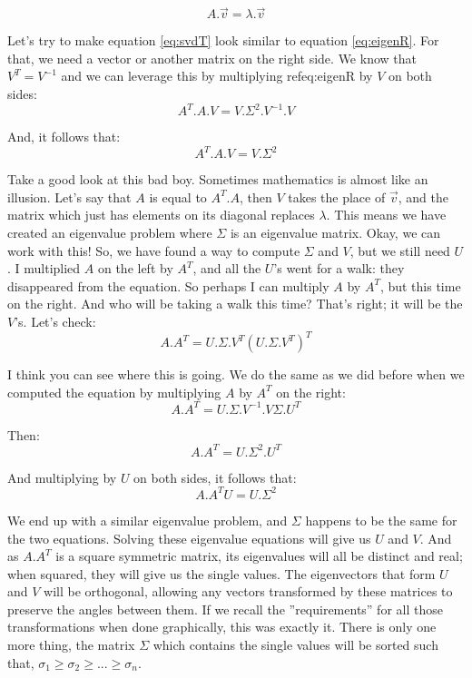 \documentclass[a4,12pt,twosided,openany]{memoir}
\begin{document}
\begin{equation}\label{eq:eigenR}
A.\overrightarrow{v} = \lambda.\overrightarrow{v}
\end{equation}
\par 
\indent
Let’s try to make equation \ref{eq:svdT} look similar to equation \ref{eq:eigenR}. For that, we need a vector or another matrix on the right side. We know that $V^T=V^{−1}$ and we can leverage this by multiplying ref{eq:eigenR} by $V$ on both sides:
\[A^T.A.V = V.\Sigma^2.V^{-1}.V\]
\par 
\indent
And, it follows that:
\begin{equation}\label{eq:finalV}
A^T.A.V = V.\Sigma^2
\end{equation}
\par 
\indent
Take a good look at this bad boy. Sometimes mathematics is almost like an illusion. Let’s say that $A$ is equal to $A^T.A$, then $V$ takes the place of $\overrightarrow{v}$, and the matrix which just has elements on its diagonal replaces $\lambda$. This means we have created an eigenvalue problem where $\Sigma$ is an eigenvalue matrix. Okay, we can work with this! So, we have found a way to compute $\Sigma$ and $V$, but we still need $U$. I multiplied $A$ on the left by $A^T$, and all the $U$’s went for a walk: they disappeared from the equation. So perhaps I can multiply $A$ by $A^T$, but this time on the right. And who will be taking a walk this time? That’s right; it will be the $V$'s. Let’s check:
\[A.A^T = U.\Sigma.V^T(U.\Sigma.V^T)^T \]
\par 
\indent
I think you can see where this is going. We do the same as we did before when we computed the equation by multiplying $A$ by $A^T$ on the right:
\[A.A^T =  U.\Sigma.V^{-1}.V\Sigma.U^T\]
\par 
\indent
Then:
\[A.A^T =  U.\Sigma^2.U^T\]
\par 
\indent
And multiplying by $U$ on both sides, it follows that:
\begin{equation}\label{eq:finalU}
A.A^T U =  U.\Sigma^2 
\end{equation}
\par 
\indent
We end up with a similar eigenvalue problem, and $\Sigma$ happens to be the same for the two equations. Solving these eigenvalue equations will give us $U$ and $V$. And as $A.A^T$ is a square symmetric matrix, its eigenvalues will all be distinct and real; when squared, they will give us the single values. The eigenvectors that form $U$ and $V$ will be orthogonal, allowing any vectors transformed by these matrices to preserve the angles between them. If we recall the ”requirements” for all those transformations when done graphically, this was exactly it. There is only one more thing, the matrix $\Sigma$ which contains the single values will be sorted such that,  $\sigma_1 \geq \sigma_2 \geq ... \geq \sigma_n$.
\end{document}
